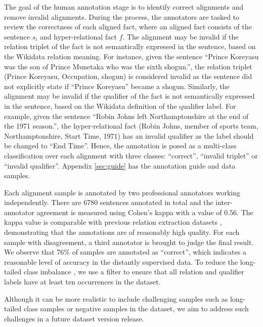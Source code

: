 \documentclass[11pt]{article}
\newcommand{\flag}[1]{#1}
\begin{document}
The goal of the human annotation stage is to identify correct alignments and remove invalid alignments.
During the process, the annotators are tasked to review the correctness of each aligned fact, where an aligned fact consists of the sentence $s_i$ and hyper-relational fact $f$.
The alignment may be invalid if the relation triplet of the fact is not semantically expressed in the sentence, based on the Wikidata relation meaning.
For instance, given the sentence ``Prince Koreyasu was the son of Prince Munetaka who was the sixth shogun.'', the relation triplet (Prince Koreyasu, Occupation, shogun) is considered invalid as the sentence did not explicitly state if ``Prince Koreyasu'' became a shogun.
Similarly, the alignment may be invalid if the qualifier of the fact is not semantically expressed in the sentence, based on the Wikidata definition of the qualifier label.
For example, given the sentence ``Robin Johns left Northamptonshire at the end of the 1971 season.'', the hyper-relational fact (Robin Johns, member of sports team, Northamptonshire, Start Time, 1971) has an invalid qualifier as the label should be changed to ``End Time''.
Hence, the annotation is posed as a multi-class classification over each alignment with three classes: ``correct'', ``invalid triplet'' or ``invalid qualifier''.
Appendix \ref{sec:guide} has the annotation guide and data samples.


Each alignment sample is annotated by two professional annotators working independently.
There are 6780 sentences annotated in total and the inter-annotator agreement is measured using Cohen's kappa with a value of 0.56.
The kappa value is comparable with previous relation extraction datasets \citep{zhang-etal-2017-position}, demonstrating that the annotations are of reasonably high quality.
For each sample with disagreement, a third annotator is brought to judge the final result. 
We observe that 76\% of samples are annotated as ``correct'', which indicates a reasonable level of accuracy in the distantly supervised data.
To reduce the long-tailed class imbalance \citep{zhang-etal-2019-long}, we use a filter to ensure that all relation and qualifier labels have at least ten occurrences in the dataset.
\flag{
Although it can be more realistic to include challenging samples such as long-tailed class samples or negative samples in the dataset, we aim to address such challenges in a future dataset version release.
}
\end{document}
